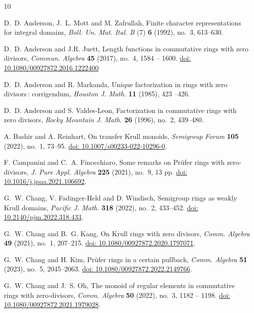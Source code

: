 \documentclass[a4paper, 10pt]{amsart}
\theoremstyle{plain}
\theoremstyle{definition}
\theoremstyle{remark}
\numberwithin{equation}{section}
\begin{document}
\begin{thebibliography}{10}

 D.~D. Anderson, J.~L. Mott and M. Zafrullah, Finite character representations for integral domains, {\it Boll. Un. Mat. Ital. B} (7) {\bf 6} (1992), no.~3, 613--630.

 D.~D. Anderson and J.R. Juett, Length functions in commutative rings with
  zero divisors, {\it Commun. Algebra} \textbf{45} (2017), no.~4, 1584 -- 1600. \href{https://doi.org/10.1080/00927872.2016.1222400}{doi: 10.1080/00927872.2016.1222400}

 D.~D. Anderson and R. Markanda, Unique factorization in rings with zero
  divisors{\rm \,:} corrigendum, {\it Houston J. Math.} \textbf{11} (1985), 423 --426.
  
 D.~D. Anderson and S. Valdes-Leon, Factorization in commutative rings with zero divisors, {\it Rocky Mountain J. Math.} {\bf 26} (1996), no.~2, 439--480. 

 A. Bashir and A. Reinhart, On transfer Krull monoids, {\it Semigroup Forum} \textbf{105} (2022), no.~1, 73--95. \href{https://link.springer.com/article/10.1007/s00233-022-10296-0}{doi: 10.1007/s00233-022-10296-0}.

F. Campanini and C.~A. Finocchiaro, Some remarks on Pr\"ufer rings with zero-divisors, {\it J. Pure Appl. Algebra} {\bf 225} (2021), no.~9, 13 pp. \href{https://doi.org/10.1016/j.jpaa.2021.106692}{doi: 10.1016/j.jpaa.2021.106692}.

 G.~W. Chang, V. Fadinger-Held and D. Windisch, Semigroup rings as weakly Krull domains, {\it Pacific J. Math.} {\bf 318} (2022), no.~2, 433--452. \href{https://msp.org/pjm/2022/318-2/p09.xhtml}{doi: 10.2140/pjm.2022.318.433}.

 G.~W. Chang and B.~G. Kang, On Krull rings with zero divisors, {\it Comm. Algebra} {\bf 49} (2021), no.~1, 207--215. \href{https://www.tandfonline.com/doi/full/10.1080/00927872.2020.1797071}{doi: 10.1080/00927872.2020.1797071}.

 G.~W. Chang and H. Kim, Pr\"{u}fer rings in a certain pullback, {\it Comm.
  Algebra} \textbf{51} (2023), no.~5, 2045--2063. \href{https://www.tandfonline.com/doi/full/10.1080/00927872.2022.2149766}{doi: 10.1080/00927872.2022.2149766}.

 G.~W. Chang and J.~S. Oh, The monoid of regular elements in commutative rings
  with zero-divisors, {\it Comm. Algebra} \textbf{50} (2022), no.~3, 1182 -- 1198. \href{https://www.tandfonline.com/doi/full/10.1080/00927872.2021.1979028}{doi: 10.1080/00927872.2021.1979028}.


\end{thebibliography}
\end{document}
